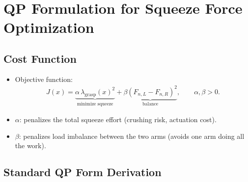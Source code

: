 \documentclass[conference]{IEEEtran}
\begin{document}
\section{QP Formulation for Squeeze Force Optimization}

\subsection{Cost Function}
\begin{itemize}
    \item Objective function:
    \begin{align}
        J(x)
        =
        \underbrace{\alpha\,\lambda_{\mathrm{grasp}}(x)^2}_{\text{minimize squeeze}}
        +
        \underbrace{\beta\left(F_{n,L}-F_{n,R}\right)^2}_{\text{balance}},
        \qquad
        \alpha,\beta>0.
    \end{align}

    \item \(\alpha\): penalizes the total squeeze effort (crushing risk, actuation cost).

    \item \(\beta\): penalizes load imbalance between the two arms (avoids one arm doing all the work).
\end{itemize}

\subsection{Standard QP Form Derivation}
\end{document}
